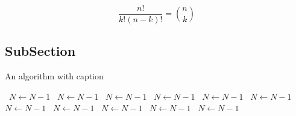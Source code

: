 \documentclass[a4paper]{article}
\begin{document}
\[ \frac{n!}{k!(n-k)!} = \binom{n}{k} \]

\subsection{SubSection}

\begin{algorithm}
\caption{An algorithm with caption}
\begin{algorithmic}
\    \State $N \gets N - 1$
\    \State $N \gets N - 1$
\    \State $N \gets N - 1$
\    \State $N \gets N - 1$
\    \State $N \gets N - 1$
\    \State $N \gets N - 1$
\    \State $N \gets N - 1$
\    \State $N \gets N - 1$
\    \State $N \gets N - 1$
\    \State $N \gets N - 1$
\    \State $N \gets N - 1$
\EndWhile
\end{algorithmic}
\end{algorithm}
\end{document}
